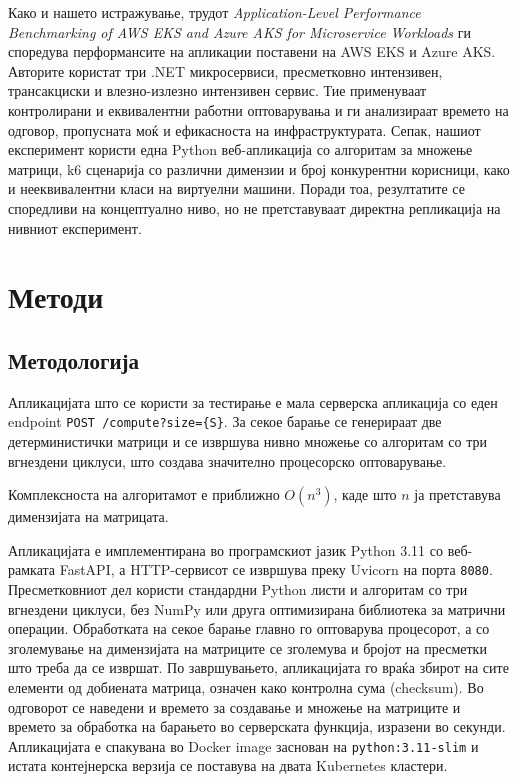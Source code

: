 \documentclass{article}
\begin{document}
Како и нашето истражување, трудот \textit{Application-Level Performance Benchmarking of AWS EKS and Azure AKS for Microservice Workloads} \cite{culligan2026} ги споредува перформансите на апликации поставени на AWS EKS и Azure AKS. Авторите користат три .NET микросервиси, пресметковно интензивен, трансакциски и влезно-излезно интензивен сервис. Тие применуваат контролирани и еквивалентни работни оптоварувања и ги анализираат времето на одговор, пропусната моќ и ефикасноста на инфраструктурата. Сепак, нашиот експеримент користи една Python веб-апликација со алгоритам за множење матрици, k6 сценарија со различни димензии и број конкурентни корисници, како и нееквивалентни класи на виртуелни машини. Поради тоа, резултатите се споредливи на концептуално ниво, но не претставуваат директна репликација на нивниот експеримент.

\section{Методи}

\subsection{Методологија}

Апликацијата што се користи за тестирање е мала серверска апликација со еден endpoint \texttt{POST /compute?size=\{S\}}. За секое барање се генерираат две детерминистички матрици и се извршува нивно множење со алгоритам со три вгнездени циклуси, што создава значително процесорско оптоварување.

Комплексноста на алгоритамот е приближно $O(n^3)$, каде што $n$ ја претставува димензијата на матрицата.

Апликацијата е имплементирана во програмскиот јазик Python 3.11 со веб-рамката FastAPI, а HTTP-сервисот се извршува преку Uvicorn на порта \texttt{8080}. Пресметковниот дел користи стандардни Python листи и алгоритам со три вгнездени циклуси, без NumPy или друга оптимизирана библиотека за матрични операции. Обработката на секое барање главно го оптоварува процесорот, а со зголемување на димензијата на матриците се зголемува и бројот на пресметки што треба да се извршат. По завршувањето, апликацијата го враќа збирот на сите елементи од добиената матрица, означен како контролна сума (checksum). Во одговорот се наведени и времето за создавање и множење на матриците и времето за обработка на барањето во серверската функција, изразени во секунди. Апликацијата е спакувана во Docker image заснован на \texttt{python:3.11-slim} и истата контејнерска верзија се поставува на двата Kubernetes кластери.
\end{document}

